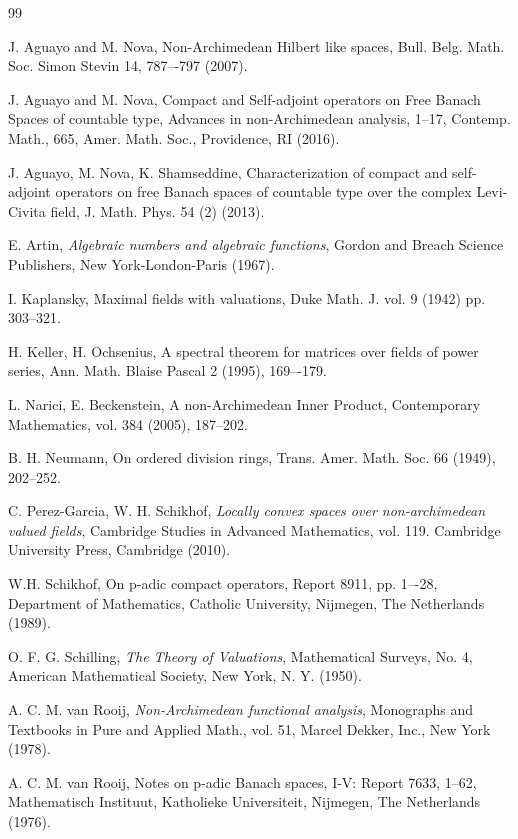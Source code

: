\documentclass[12pt]{amsart}
\theoremstyle{plain}
\theoremstyle{definition}
\begin{document}
\begin{thebibliography}{99}

   J. Aguayo and M. Nova, Non-Archimedean Hilbert like spaces, Bull. Belg. Math. Soc. Simon Stevin 14, 787–-797
(2007).

    J. Aguayo and M. Nova, Compact and Self-adjoint operators on Free Banach Spaces of
countable type, Advances in non-Archimedean analysis, 1--17, Contemp. Math., 665, Amer.
Math. Soc., Providence, RI (2016).

   J. Aguayo, M. Nova, K. Shamseddine, Characterization of compact and self-adjoint operators on free Banach spaces of countable type over the complex
Levi-Civita field, J. Math. Phys. 54 (2) (2013).

    E. Artin, \textit{Algebraic numbers and algebraic functions}, Gordon and Breach Science Publishers, New York-London-Paris (1967).

    I. Kaplansky, Maximal fields with valuations, Duke Math. J. vol. 9 (1942) pp. 303--321.

   H. Keller, H. Ochsenius, A spectral theorem for matrices over fields of power
series, Ann. Math. Blaise Pascal 2 (1995), 169–-179.

    L. Narici, E. Beckenstein, A non-Archimedean Inner Product, Contemporary Mathematics, vol. 384 (2005), 187--202.

   B. H. Neumann, On ordered division rings, Trans. Amer. Math. Soc. 66 (1949), 202--252.

   C. Perez-Garcia, W. H. Schikhof, \textit{Locally convex spaces over non-archimedean valued fields}, Cambridge Studies in Advanced Mathematics, vol. 119. Cambridge University Press, Cambridge (2010).

   W.H. Schikhof, On p-adic compact operators, Report 8911, pp. 1–-28, Department of Mathematics, Catholic University, Nijmegen, The Netherlands (1989).

    O. F. G. Schilling, \textit{The Theory of Valuations}, Mathematical Surveys, No. 4, American Mathematical Society, New York, N. Y. (1950).

   A. C. M. van Rooij, \textit{Non-Archimedean functional analysis}, Monographs and Textbooks in
Pure and Applied Math., vol. 51, Marcel Dekker, Inc., New York (1978).

   A. C. M. van Rooij, Notes on p-adic Banach spaces, I-V: Report 7633, 1--62, Mathematisch Instituut, Katholieke Universiteit, Nijmegen, The Netherlands (1976).

  

 
  
  
\end{thebibliography}
\end{document}
